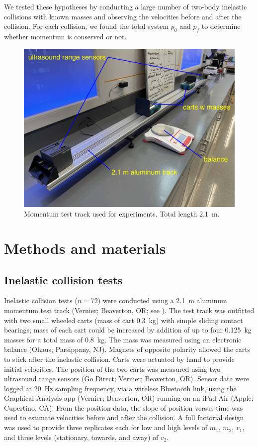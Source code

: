 \documentclass[aps,prl,preprint]{revtex4-1}
\begin{document}
We tested these hypotheses by conducting a large number of two-body inelastic collisions with known masses and observing the velocities before and after the collision. For each collision, we found the total system $p_0$ and $p_f$ to determine whether momentum is conserved or not. 
\begin{figure}[h]
\begin{center}
\includegraphics[width=\columnwidth]{fig1.png}
\end{center}
\caption{Momentum test track used for experiments. Total length \SI{2.1}{\meter}.}
\label{fig:methods1}
\end{figure}

\section{Methods and materials}
\subsection{Inelastic collision tests}
Inelastic collision tests ($n=72$) were conducted using a \SI{2.1}{\meter} aluminum momentum test track (Vernier; Beaverton, OR; see ). The test track was outfitted with two small wheeled carts (mass of cart \SI{0.3}{\kilo\gram}) with simple sliding contact bearings; mass of each cart could be increased by addition of up to four \SI{0.125}{\kilo\gram} masses for a total mass of \SI{0.8}{\kilo\gram}. The mass was measured using an electronic balance (Ohaus; Parsippany, NJ).    Magnets of opposite polarity allowed the carts to stick after the inelastic collision. Carts were actuated by hand to provide initial velocities. The position of the two carts was measured using two ultrasound range sensors (Go Direct; Vernier; Beaverton, OR). Sensor data were logged at \SI{20}{\hertz} sampling frequency, via a wireless Bluetooth link, using the Graphical Analysis app (Vernier; Beaverton, OR) running on an iPad Air (Apple; Cupertino, CA). From the position data, the slope of position versus time was used to estimate velocities before and after the collision.  A full factorial design was used to provide three replicates each for low and high levels of $m_1$, $m_2$, $v_1$, and three levels (stationary, towards, and away) of $v_2$.  
\end{document}
